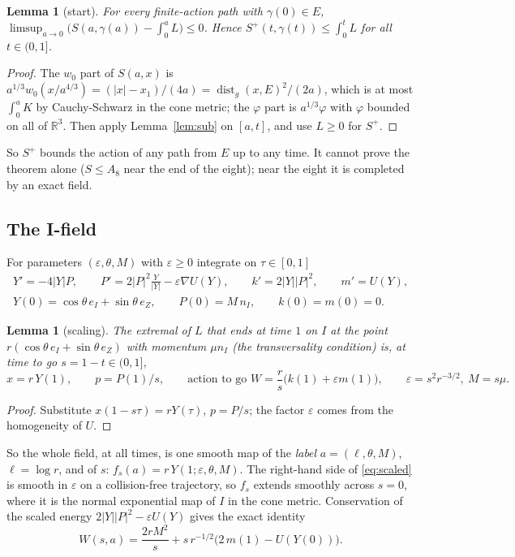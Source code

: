 \documentclass[11pt]{article}
\newtheorem{lemma}[theorem]{Lemma}
\theoremstyle{definition}
\begin{document}
\begin{lemma}[start]\label{lem:start}
For every finite-action path with $\gamma(0)\in E$, $\limsup_{a\to0}\bigl(S(a,\gamma(a))-\int_0^aL\bigr)\le0$. Hence
$S^+(t,\gamma(t))\le\int_0^tL$ for all $t\in(0,1]$.
\end{lemma}
\begin{proof}
The $w_0$ part of $S(a,x)$ is $a^{1/3}w_0(x/a^{4/3})=(|x|-x_1)/(4a)=\operatorname{dist}_g(x,E)^2/(2a)$, which is at most
$\int_0^aK$ by Cauchy-Schwarz in the cone metric; the $\varphi$ part is $a^{1/3}\varphi$ with $\varphi$ bounded on all
of $\mathbb R^3$. Then apply Lemma~\ref{lem:sub} on $[a,t]$, and use $L\ge0$ for $S^+$.
\end{proof}
So $S^+$ bounds the action of any path from $E$ up to any time. It cannot prove the theorem alone ($S\le A_8$ near the
end of the eight); near the eight it is completed by an exact field.

\subsection{The I-field}\label{sec:ifield}
For parameters $(\varepsilon,\theta,M)$ with $\varepsilon\ge0$ integrate on $\tau\in[0,1]$
\begin{equation}\label{eq:scaled}
\begin{gathered}
Y'=-4|Y|P,\qquad P'=2|P|^2\frac{Y}{|Y|}-\varepsilon\nabla U(Y),\qquad k'=2|Y||P|^2,\qquad m'=U(Y),\\
Y(0)=\cos\theta\,e_I+\sin\theta\,e_Z,\qquad P(0)=M\,n_I,\qquad k(0)=m(0)=0 .
\end{gathered}
\end{equation}
\begin{lemma}[scaling]\label{lem:scaling}
The extremal of $L$ that ends at time $1$ on $I$ at the point $r(\cos\theta\,e_I+\sin\theta\,e_Z)$ with momentum
$\mu n_I$ (the transversality condition) is, at time to go $s=1-t\in(0,1]$,
\[
x=r\,Y(1),\qquad p=P(1)/s,\qquad\text{action to go }W=\frac rs\bigl(k(1)+\varepsilon m(1)\bigr),\qquad
\varepsilon=s^2r^{-3/2},\ M=s\mu .
\]
\end{lemma}
\begin{proof}
Substitute $x(1-s\tau)=rY(\tau)$, $p=P/s$; the factor $\varepsilon$ comes from the homogeneity of $U$.
\end{proof}
So the whole field, at all times, is one smooth map of the \emph{label} $a=(\ell,\theta,M)$, $\ell=\log r$, and of
$s$: $f_s(a)=r\,Y(1;\varepsilon,\theta,M)$. The right-hand side of \eqref{eq:scaled} is smooth in $\varepsilon$ on a
collision-free trajectory, so $f_s$ extends smoothly across $s=0$, where it is the normal exponential map of $I$ in
the cone metric. Conservation of the scaled energy $2|Y||P|^2-\varepsilon U(Y)$ gives the exact identity
\begin{equation}\label{eq:energy}
W(s,a)=\frac{2rM^2}{s}+s\,r^{-1/2}\bigl(2\,m(1)-U(Y(0))\bigr).
\end{equation}
\end{document}
